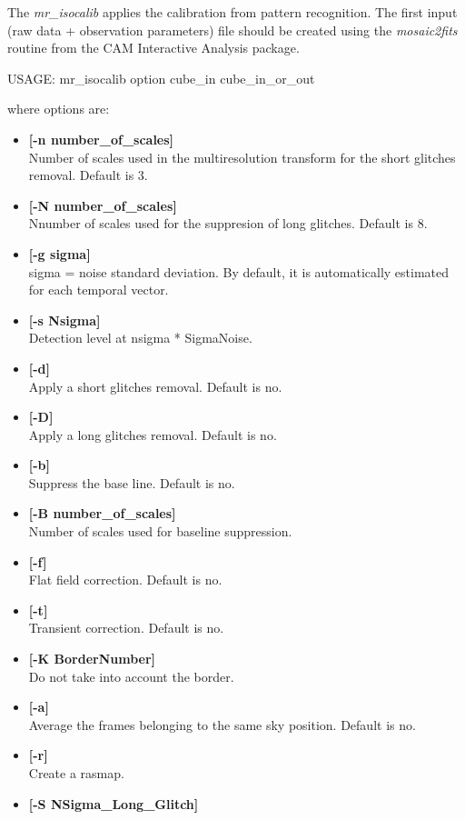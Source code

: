 The {\em mr\_isocalib} applies the calibration from pattern recognition.
The first input (raw data + observation parameters) file should be created 
using the {\em mosaic2fits} routine from the CAM Interactive Analysis package.
\begin{center}
 USAGE: mr\_isocalib option cube\_in cube\_in\_or\_out
\end{center}
where options are:
\begin{itemize}
\item {\bf [-n number\_of\_scales]} \\
Number of scales used in the multiresolution transform for the short glitches
removal. 
Default is 3.
\item {\bf [-N number\_of\_scales]} \\
Nnumber of scales used for the suppresion of long glitches. 
Default is 8.
\item {\bf [-g sigma]} \\
sigma = noise standard deviation. By default, it is automatically
estimated for each temporal vector.
\item {\bf [-s Nsigma]} \\
Detection level at nsigma * SigmaNoise.
\item {\bf [-d]} \\
Apply a short  glitches removal.  Default is no.
\item {\bf [-D]} \\
Apply a long glitches removal. Default is no.
\item {\bf [-b]} \\
Suppress the base line. Default is no.
\item {\bf [-B number\_of\_scales]} \\
 Number of scales used for baseline suppression.
\item {\bf [-f]} \\
Flat field correction. Default is no.
\item {\bf [-t]} \\ 
 Transient correction. Default is no.
\item {\bf [-K BorderNumber]} \\
Do not take into account the border.
\item {\bf [-a]} \\
Average the frames belonging to the same sky position. Default is no.
\item {\bf [-r]} \\
Create a rasmap.
\item {\bf [-S NSigma\_Long\_Glitch]} \\

\end{itemize}
